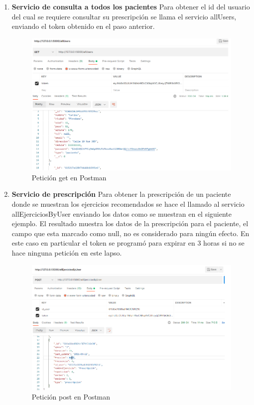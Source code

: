 \documentclass[12pt]{article}
\begin{document}
\begin{enumerate}
    \item \textbf{Servicio de consulta a todos los pacientes} Para obtener el id del usuario del cual se requiere consultar su prescripción se llama el servicio allUsers, enviando el token obtenido en el paso anterior.
    
            \begin{figure}[ht]
            \centering
            \includegraphics[scale=0.4]{imag/allus.png}
            \caption{Petición get en Postman }
            \label{6}
            \end{figure}
            \FloatBarrier
            
    \item \textbf{Servicio de prescripción}  Para obtener la prescripción de un paciente donde se muestran los ejercicios recomendados se hace el llamado al servicio allEjerciciosByUser enviando los datos como se muestran en el siguiente ejemplo. El resultado muestra los datos de la prescripción para el paciente, el campo que esta marcado como null, no es considerado para ningún efecto. En este caso en particular el token se programó para expirar en 3 horas si no se hace ninguna petición en este lapso.
    
            \begin{figure}[ht]
            \centering
            \includegraphics[scale=0.4]{imag/prees.png}
            \caption{Petición post en Postman }
            \label{6}
            \end{figure}
            \FloatBarrier
    



\end{enumerate}
\end{document}
